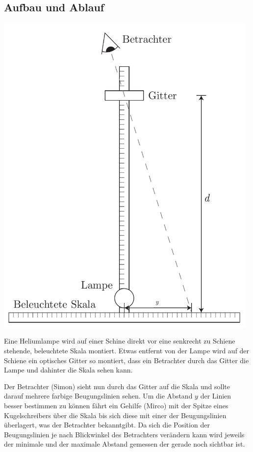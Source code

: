 \documentclass[12pt,a4paper]{article}
\begin{document}
\subsection*{Aufbau und Ablauf}
\includegraphics[width=13cm]{illustration.pdf}

Eine Heliumlampe wird auf einer Schine direkt vor eine senkrecht zu Schiene stehende, beleuchtete Skala montiert. Etwas entfernt von der Lampe wird auf der Schiene ein optisches Gitter so montiert, dass ein Betrachter durch das Gitter die Lampe und dahinter die Skala sehen kann.

Der Betrachter (Simon) sieht nun durch das Gitter auf die Skala und sollte darauf mehrere farbige Beugungslinien sehen. Um die Abstand $y$ der Linien besser bestimmen zu k\"onnen f\"ahrt ein Gehilfe (Mirco) mit der Spitze eines Kugelschreibers \"uber die Skala bis sich diese mit einer der Beugungslinien \"uberlagert, was der Betrachter bekanntgibt. Da sich die Position der Beugungslinien je nach Blickwinkel des Betrachters ver\"andern kann wird jeweils der minimale und der maximale Abstand gemessen der gerade noch sichtbar ist.
\end{document}
